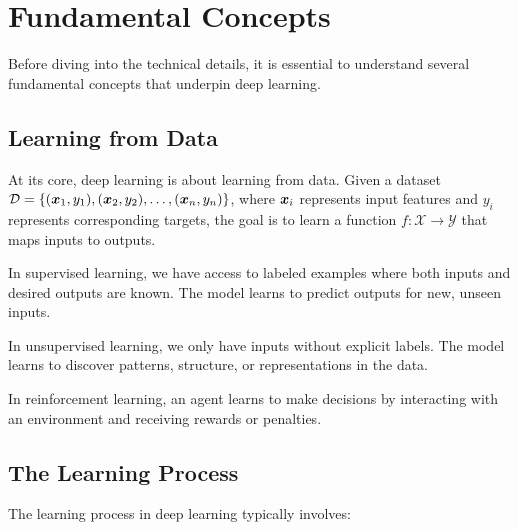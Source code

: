 
\section{Fundamental Concepts }
\label{sec:fundamental-concepts}

Before diving into the technical details, it is essential to understand several fundamental concepts that underpin deep learning.

\subsection{Learning from Data}

At its core, deep learning is about learning from data. Given a dataset $\mathcal{D} = \{(\boldsymbol{x}_1, y_1), (\boldsymbol{x}_2, y_2), \ldots, (\boldsymbol{x}_n, y_n)\}$, where $\boldsymbol{x}_i$ represents input features and $y_i$ represents corresponding targets, the goal is to learn a function $f: \mathcal{X} \rightarrow \mathcal{Y}$ that maps inputs to outputs.

\begin{definition}
In supervised learning, we have access to labeled examples where both inputs and desired outputs are known. The model learns to predict outputs for new, unseen inputs.
\end{definition}

\begin{definition}
In unsupervised learning, we only have inputs without explicit labels. The model learns to discover patterns, structure, or representations in the data.
\end{definition}

\begin{definition}
In reinforcement learning, an agent learns to make decisions by interacting with an environment and receiving rewards or penalties.
\end{definition}

\subsection{The Learning Process}

The learning process in deep learning typically involves:

